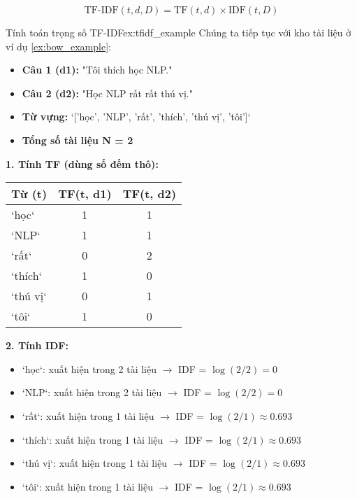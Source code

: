 \begin{equation}
    \text{TF-IDF}(t, d, D) = \text{TF}(t, d) \times \text{IDF}(t, D)
    \label{eq:tfidf}
\end{equation}

\begin{example}{Tính toán trọng số TF-IDF}{ex:tfidf_example}
    Chúng ta tiếp tục với kho tài liệu ở ví dụ \ref{ex:bow_example}:
    \begin{itemize}
        \item \textbf{Câu 1 (d1):} "Tôi thích học NLP."
        \item \textbf{Câu 2 (d2):} "Học NLP rất rất thú vị."
        \item \textbf{Từ vựng:} `['học', 'NLP', 'rất', 'thích', 'thú vị', 'tôi']`
        \item \textbf{Tổng số tài liệu N = 2}
    \end{itemize}

    \textbf{1. Tính TF (dùng số đếm thô):}
    \begin{center}
    \begin{tabular}{|l|c|c|}
        \hline
        \textbf{Từ (t)} & \textbf{TF(t, d1)} & \textbf{TF(t, d2)} \\
        \hline
        `học` & 1 & 1 \\
        `NLP` & 1 & 1 \\
        `rất` & 0 & 2 \\
        `thích` & 1 & 0 \\
        `thú vị` & 0 & 1 \\
        `tôi` & 1 & 0 \\
        \hline
    \end{tabular}
    \end{center}

    \textbf{2. Tính IDF:}
    \begin{itemize}
        \item `học`: xuất hiện trong 2 tài liệu \(\rightarrow\) IDF = $\log(2/2) = 0$
        \item `NLP`: xuất hiện trong 2 tài liệu \(\rightarrow\) IDF = $\log(2/2) = 0$
        \item `rất`: xuất hiện trong 1 tài liệu \(\rightarrow\) IDF = $\log(2/1) \approx 0.693$
        \item `thích`: xuất hiện trong 1 tài liệu \(\rightarrow\) IDF = $\log(2/1) \approx 0.693$
        \item `thú vị`: xuất hiện trong 1 tài liệu \(\rightarrow\) IDF = $\log(2/1) \approx 0.693$
        \item `tôi`: xuất hiện trong 1 tài liệu \(\rightarrow\) IDF = $\log(2/1) \approx 0.693$
    \end{itemize}
    

\end{example}
